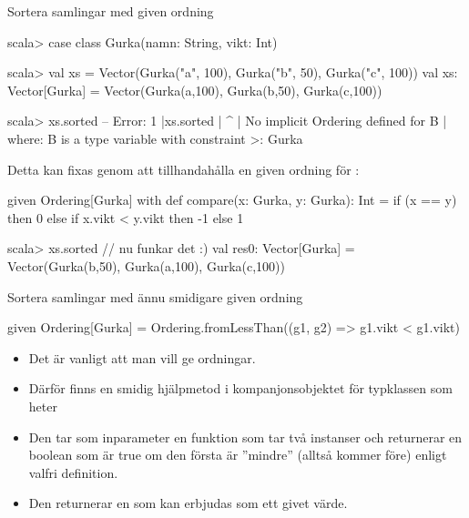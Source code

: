 \begin{Slide}{Sortera samlingar med given ordning}\SlideFontSmall
\begin{REPLsmall}
scala> case class Gurka(namn: String, vikt: Int)
                                                                                                                                            
scala> val xs = Vector(Gurka("a", 100), Gurka("b", 50), Gurka("c", 100))
val xs: Vector[Gurka] = Vector(Gurka(a,100), Gurka(b,50), Gurka(c,100))
                                                                                                                                            
scala> xs.sorted
-- Error:
1 |xs.sorted
  | ^
  | No implicit Ordering defined for B
  | where: B is a type variable with constraint >: Gurka

\end{REPLsmall}
\pause
Detta kan fixas genom att tillhandahålla en given ordning för :
\begin{Code}
given Ordering[Gurka] with
  def compare(x: Gurka, y: Gurka): Int =
    if (x == y) then 0 
    else if x.vikt < y.vikt then -1 
    else 1
\end{Code}
\begin{REPL}
scala> xs.sorted   // nu funkar det :)
val res0: Vector[Gurka] = Vector(Gurka(b,50), Gurka(a,100), Gurka(c,100))
\end{REPL}
\end{Slide}

\begin{Slide}{Sortera samlingar med ännu smidigare given ordning}\SlideFontSmall

\begin{Code}
given Ordering[Gurka] = Ordering.fromLessThan((g1, g2) => g1.vikt < g1.vikt)
\end{Code}


\begin{itemize}
  \item Det är vanligt att man vill ge ordningar.
  \item Därför finns en smidig hjälpmetod i kompanjonsobjektet för typklassen  som heter 
  \item Den tar som inparameter en funktion som tar två instanser och returnerar en boolean som är true om den första är ''mindre'' (alltså kommer före) enligt valfri definition. 
  \item Den returnerar en  som kan erbjudas som ett givet värde.
\end{itemize}

\end{Slide}



